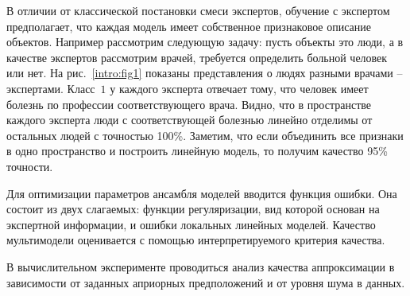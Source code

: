 \documentclass[12pt, twoside]{article}
\numberwithin{equation}{section}
\begin{document}
В отличии от классической постановки смеси экспертов, обучение с экспертом предполагает, что каждая модель имеет собственное признаковое описание объектов. Например рассмотрим следующую задачу: пусть объекты это люди, а в качестве экспертов рассмотрим врачей, требуется определить больной человек или нет. На рис.~\ref{intro:fig1} показаны представления о людях разными врачами -- экспертами. Класс~$1$ у каждого эксперта отвечает тому, что человек имеет болезнь по профессии соответствующего врача. Видно, что в пространстве каждого эксперта люди с соответствующей болезнью линейно отделимы от остальных людей с точностью 100\%. Заметим, что если объединить все признаки в одно пространство и построить линейную модель, то получим качество 95\% точности. 

Для оптимизации параметров ансамбля моделей вводится функция ошибки. Она состоит из двух слагаемых: функции регуляризации, вид которой основан на экспертной информации, и ошибки локальных линейных моделей. Качество мультимодели оценивается с помощью интерпретируемого критерия качества.

В вычислительном эксперименте проводиться анализ качества аппроксимации в зависимости от заданных априорных предположений и от уровня шума в данных.
\end{document}
